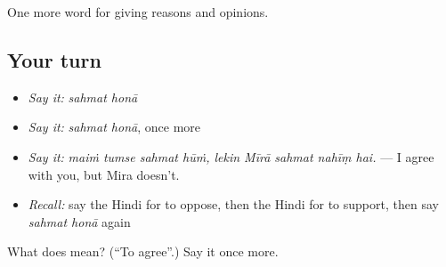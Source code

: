 \begin{grammarlens}[title={What you've built}]
One more word for giving reasons and opinions.
\end{grammarlens}

\subsection*{Your turn}
\begin{itemize}
\raggedright
  \item \emph{Say it:} \emph{sahmat honā}
  \item \emph{Say it:} \emph{sahmat honā}, once more
  \item \emph{Say it:} \emph{maiṁ tumse sahmat hūṁ, lekin Mīrā sahmat nahīṃ hai.} — I agree with you, but Mira doesn't.
  \item \emph{Recall:} say the Hindi for to oppose, then the Hindi for to support, then say \emph{sahmat honā} again
\end{itemize}

\begin{tcolorbox}[breakable,colback=teal!4,colframe=teal!35!black,title={Before you move on}]
What does   mean? (\textquotedblleft{}To agree\textquotedblright{}.) Say it once more.
\end{tcolorbox}
